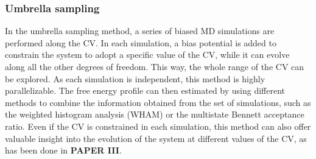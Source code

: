 \subsubsection{Umbrella sampling}
In the umbrella sampling method, a series of biased MD simulations are performed along the CV. In each simulation, a bias potential is added to constrain the system to adopt a specific value of the CV, while it can evolve along all the other degrees of freedom. This way, the whole range of the CV can be explored. As each simulation is independent, this method is highly parallelizable. The free energy profile can then estimated by using different methods to combine the information obtained from the set of simulations, such as the weighted histogram analysis (WHAM) or the multistate Bennett acceptance ratio\cite{kumar1992weighted, torrie1977nonphysical}. Even if the CV is constrained in each simulation, this method can also offer valuable insight into the evolution of the system at different values of the CV, as has been done in \textbf{PAPER III}.


\clearpage{\pagestyle{empty}\cleardoublepage}


%
%
